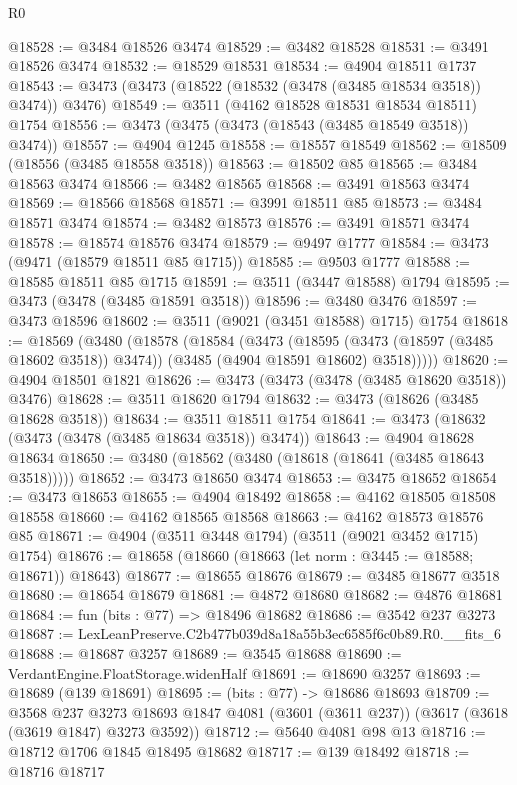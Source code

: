 \begin{lexlean}{R0}
\begin{coremodule}
@18528 := @3484 @18526 @3474
@18529 := @3482 @18528
@18531 := @3491 @18526 @3474
@18532 := @18529 @18531
@18534 := @4904 @18511 @1737
@18543 := @3473 (@3473 (@18522 (@18532 (@3478 (@3485 @18534 @3518)) @3474)) @3476)
@18549 := @3511 (@4162 @18528 @18531 @18534 @18511) @1754
@18556 := @3473 (@3475 (@3473 (@18543 (@3485 @18549 @3518)) @3474))
@18557 := @4904 @1245
@18558 := @18557 @18549
@18562 := @18509 (@18556 (@3485 @18558 @3518))
@18563 := @18502 @85
@18565 := @3484 @18563 @3474
@18566 := @3482 @18565
@18568 := @3491 @18563 @3474
@18569 := @18566 @18568
@18571 := @3991 @18511 @85
@18573 := @3484 @18571 @3474
@18574 := @3482 @18573
@18576 := @3491 @18571 @3474
@18578 := @18574 @18576 @3474
@18579 := @9497 @1777
@18584 := @3473 (@9471 (@18579 @18511 @85 @1715))
@18585 := @9503 @1777
@18588 := @18585 @18511 @85 @1715
@18591 := @3511 (@3447 @18588) @1794
@18595 := @3473 (@3478 (@3485 @18591 @3518))
@18596 := @3480 @3476
@18597 := @3473 @18596
@18602 := @3511 (@9021 (@3451 @18588) @1715) @1754
@18618 := @18569
    (@3480
      (@18578
        (@18584
          (@3473
            (@18595 (@3473 (@18597 (@3485 @18602 @3518)) @3474))
            (@3485 (@4904 @18591 @18602) @3518)))))
@18620 := @4904 @18501 @1821
@18626 := @3473 (@3473 (@3478 (@3485 @18620 @3518)) @3476)
@18628 := @3511 @18620 @1794
@18632 := @3473 (@18626 (@3485 @18628 @3518))
@18634 := @3511 @18511 @1754
@18641 := @3473 (@18632 (@3473 (@3478 (@3485 @18634 @3518)) @3474))
@18643 := @4904 @18628 @18634
@18650 := @3480 (@18562 (@3480 (@18618 (@18641 (@3485 @18643 @3518)))))
@18652 := @3473 @18650 @3474
@18653 := @3475 @18652
@18654 := @3473 @18653
@18655 := @4904 @18492
@18658 := @4162 @18505 @18508 @18558
@18660 := @4162 @18565 @18568
@18663 := @4162 @18573 @18576 @85
@18671 := @4904 (@3511 @3448 @1794) (@3511 (@9021 @3452 @1715) @1754)
@18676 := @18658 (@18660 (@18663 (let norm : @3445 := @18588; @18671)) @18643)
@18677 := @18655 @18676
@18679 := @3485 @18677 @3518
@18680 := @18654 @18679
@18681 := @4872 @18680
@18682 := @4876 @18681
@18684 := fun (bits : @77) => @18496 @18682
@18686 := @3542 @237 @3273
@18687 := LexLeanPreserve.C2b477b039d8a18a55b3ec6585f6c0b89.R0.__fits_6
@18688 := @18687 @3257
@18689 := @3545 @18688
@18690 := VerdantEngine.FloatStorage.widenHalf
@18691 := @18690 @3257
@18693 := @18689 (@139 @18691)
@18695 := (bits : @77) -> @18686 @18693
@18709 := @3568
    @237
    @3273
    @18693
    @1847
    @4081
    (@3601 (@3611 @237))
    (@3617 (@3618 (@3619 @1847) @3273 @3592))
@18712 := @5640 @4081 @98 @13
@18716 := @18712 @1706 @1845 @18495 @18682
@18717 := @139 @18492
@18718 := @18716 @18717

\end{coremodule}
\end{lexlean}
